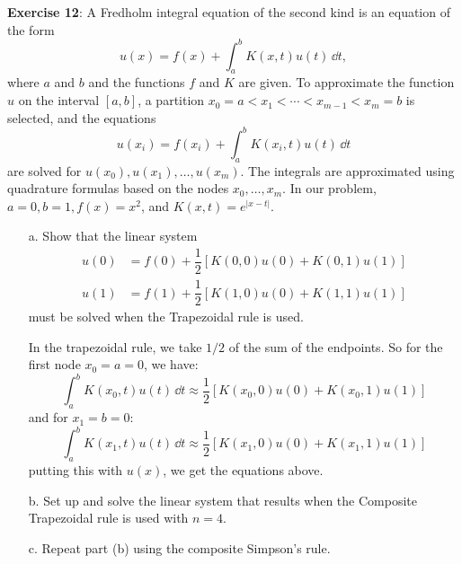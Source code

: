 \documentclass{article}
\begin{document}
\textbf{Exercise 12}: A Fredholm integral equation of the second kind is an equation of the form
    \begin{equation*}
        u(x) = f(x) + \int_{a}^{b} K(x, t) u(t) \, \dd{t},
    \end{equation*} 
    where $a$ and $b$ and the functions $f$ and $K$ are given. To approximate the function $u$ on the interval $[a, b]$, a partition $x_{0} = a < x_{1} < \cdots < x_{m - 1} < x_{m} = b$ is selected, and the equations
        \begin{equation*}
            u(x_{i}) = f(x_{i}) + \int_{a}^{b} K(x_{i}, t)u(t) \, \dd{t}
        \end{equation*}
    are solved for $u(x_{0}), u(x_{1}), \ldots, u(x_{m})$. The integrals are approximated using quadrature formulas based on the nodes $x_{0}, \ldots, x_{m}$. In our problem, $a = 0, b = 1, f(x) = x^{2}$, and $K(x, t) = e^{\lvert x - t \rvert}$.
    \begin{itemize}
        \item [a.] Show that the linear system
            \begin{align*}
                u(0) &= f(0) + \dfrac{1}{2}[K(0, 0)u(0) + K(0, 1)u(1)] \\
                u(1) &= f(1) + \dfrac{1}{2}[K(1, 0)u(0) + K(1, 1)u(1)]   
            \end{align*}
        must be solved when the Trapezoidal rule is used.
            \begin{answer}
                In the trapezoidal rule, we take $1/2$ of the sum of the endpoints. So for the first node $x_{0} = a = 0$, we have:
                    \begin{equation*}
                        \int_{a}^{b} K(x_{0}, t)u(t) \, \dd{t} \approx \dfrac{1}{2}[K(x_{0}, 0)u(0) + K(x_{0}, 1)u(1)]
                    \end{equation*}
                and for $x_{1} = b = 0$:
                    \begin{equation*}
                        \int_{a}^{b} K(x_{1}, t)u(t) \, \dd{t} \approx \dfrac{1}{2}[K(x_{1}, 0)u(0) + K(x_{1}, 1)u(1)]
                    \end{equation*}
                putting this with $u(x)$, we get the equations above.
            \end{answer}

        \item [b.] Set up and solve the linear system that results when the Composite Trapezoidal rule is used with $n = 4$.

        \item [c.] Repeat part (b) using the composite Simpson's rule.
    \end{itemize}
\end{document}
